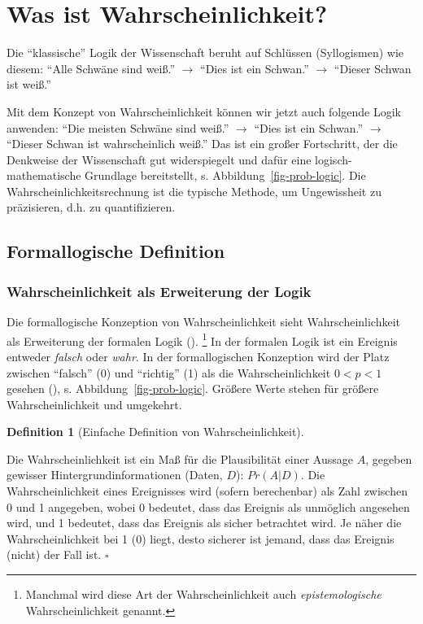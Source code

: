 \documentclass[
  ngerman,
  letterpaper,
  twoside,
  open=any]{scrbook}
\theoremstyle{definition}
\theoremstyle{plain}
\theoremstyle{definition}
\theoremstyle{definition}
\newtheorem{definition}{Definition}[chapter]
\theoremstyle{remark}
\begin{document}
\section{Was ist Wahrscheinlichkeit?}\label{was-ist-wahrscheinlichkeit}

Die \enquote{klassische} Logik der Wissenschaft beruht auf Schlüssen
(Syllogismen) wie diesem: \enquote{Alle Schwäne sind weiß.}
\(\rightarrow\) \enquote{Dies ist ein Schwan.} \(\rightarrow\)
\enquote{Dieser Schwan ist weiß.}

Mit dem Konzept von Wahrscheinlichkeit können wir jetzt auch folgende
Logik anwenden: \enquote{Die meisten Schwäne sind weiß.} \(\rightarrow\)
\enquote{Dies ist ein Schwan.} \(\rightarrow\) \enquote{Dieser Schwan
ist wahrscheinlich weiß.} Das ist ein großer Fortschritt, der die
Denkweise der Wissenschaft gut widerspiegelt und dafür eine
logisch-mathematische Grundlage bereitstellt, s.
Abbildung~\ref{fig-prob-logic}. Die Wahrscheinlichkeitsrechnung ist die
typische Methode, um Ungewissheit zu präzisieren, d.h. zu
quantifizieren.

\subsection{Formallogische Definition}\label{formallogische-definition}

\subsubsection{Wahrscheinlichkeit als Erweiterung der
Logik}\label{wahrscheinlichkeit-als-erweiterung-der-logik}

Die formallogische Konzeption von Wahrscheinlichkeit sieht
Wahrscheinlichkeit als Erweiterung der formalen Logik
(). \footnote{Manchmal
  wird diese Art der Wahrscheinlichkeit auch \emph{epistemologische}
  Wahrscheinlichkeit genannt.} In der formalen Logik ist ein Ereignis
entweder \emph{falsch} oder \emph{wahr}. In der formallogischen
Konzeption wird der Platz zwischen \enquote{falsch} (0) und
\enquote{richtig} (1) als die Wahrscheinlichkeit \(0<p<1\) gesehen
(), s.
Abbildung~\ref{fig-prob-logic}. Größere Werte stehen für größere
Wahrscheinlichkeit und umgekehrt.

\begin{definition}[Einfache Definition von
Wahrscheinlichkeit]\protect\hypertarget{def-wskt}{}\label{def-wskt}

Die Wahrscheinlichkeit ist ein Maß für die Plausibilität einer Aussage
\(A\), gegeben gewisser Hintergrundinformationen (Daten, \(D\)):
\(Pr(A|D)\). Die Wahrscheinlichkeit eines Ereignisses wird (sofern
berechenbar) als Zahl zwischen 0 und 1 angegeben, wobei 0 bedeutet, dass
das Ereignis als unmöglich angesehen wird, und 1 bedeutet, dass das
Ereignis als sicher betrachtet wird. Je näher die Wahrscheinlichkeit bei
1 (0) liegt, desto sicherer ist jemand, dass das Ereignis (nicht) der
Fall ist. \(\square\)

\end{definition}
\end{document}
